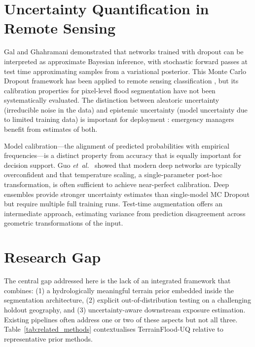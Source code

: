\documentclass[12pt,oneside]{report}
\newcommand{\etal}{\textit{et~al.}}
\begin{document}
\section{Uncertainty Quantification in Remote Sensing}

Gal and Ghahramani \cite{gal2016dropout} demonstrated that networks trained
with dropout can be interpreted as approximate Bayesian inference, with
stochastic forward passes at test time approximating samples from a variational
posterior.
This Monte Carlo Dropout framework has been applied to remote sensing
classification \cite{kampffmeyer2016semantic}, but its calibration properties
for pixel-level flood segmentation have not been systematically evaluated.
The distinction between aleatoric uncertainty (irreducible noise in the data)
and epistemic uncertainty (model uncertainty due to limited training data) is
important for deployment \cite{kendall2017uncertainties}: emergency managers
benefit from estimates of both.

Model calibration—the alignment of predicted probabilities with empirical
frequencies—is a distinct property from accuracy that is equally important for
decision support.
Guo \etal~\cite{guo2017calibration} showed that modern deep networks are
typically overconfident and that temperature scaling, a single-parameter
post-hoc transformation, is often sufficient to achieve near-perfect calibration.
Deep ensembles \cite{lakshminarayanan2017simple} provide stronger uncertainty
estimates than single-model MC Dropout but require multiple full training runs.
Test-time augmentation \cite{ayhan2022test} offers an intermediate approach,
estimating variance from prediction disagreement across geometric transformations
of the input.

\section{Research Gap}

The central gap addressed here is the lack of an integrated framework that
combines: (1) a hydrologically meaningful terrain prior embedded inside the
segmentation architecture, (2) explicit out-of-distribution testing on a
challenging holdout geography, and (3) uncertainty-aware downstream exposure
estimation.
Existing pipelines often address one or two of these aspects but not all three.
Table~\ref{tab:related_methods} contextualises TerrainFlood-UQ relative to
representative prior methods.
\end{document}
